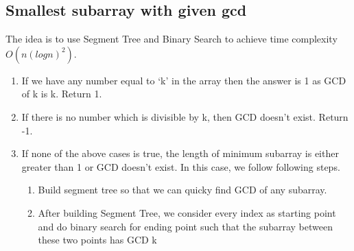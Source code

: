 \documentclass[8pt, a4paper, oneside, twocolumn]{extarticle}
\begin{document}
\subsection{Smallest subarray with given gcd}
The idea is to use Segment Tree and Binary Search to achieve time complexity $O(n(logn)^2)$.
\begin{enumerate}
    \item If we have any number equal to ‘k’ in the array then the answer is 1 as GCD of k is k. Return 1.
    \item If there is no number which is divisible by k, then GCD doesn’t exist. Return -1.
    \item If none of the above cases is true, the length of minimum subarray is either greater than 1 or GCD doesn’t exist. In this case, we follow following steps.
        \begin{enumerate}
        \item Build segment tree so that we can quicky find GCD of any subarray. 
        \item After building Segment Tree, we consider every index as starting point and do binary search for ending point such that the subarray between these two points has GCD k
        \end{enumerate}
\end{enumerate}
\end{document}
